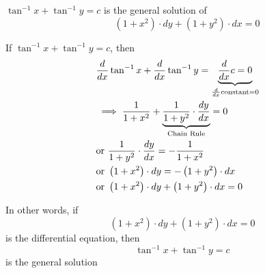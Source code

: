 \documentclass[14pt,fleqn]{extarticle}
\newcommand\itanx{\tan^{-1} x}
\newcommand\itany{\tan^{-1} y}
\newcommand\trma{\left(1+x^2 \right)}
\newcommand\trmb{ \left(1+y^2 \right)}
\begin{document}
 
\begin{snippet}
    \correct
    
    $\itanx + \itany = c$ is the general solution of 
    \[ \qquad \left(1+x^2 \right)\cdot dy + \left(1+y^2 \right)\cdot dx = 0 \]    
    
    \reason
    
    If $\itanx + \itany = c$, then 
    \begin{align}
	&\ddx \itanx + \ddx \itany = \underbrace{\ddx c = 0}_{\ddx\text{constant} = 0}\\
	&\implies \frac{1}{1+x^2} + \underbrace{\frac{1}{1+y^2}\cdot \dydx}_{\text{Chain Rule}} = 0 \\
	&\text{or }\frac{1}{1+y^2}\cdot \dydx = -\frac{1}{1+x^2} \\
	&\text{or }\trma\cdot dy = -\trmb\cdot dx \\
	&\text{or }\trma\cdot dy + \trmb\cdot dx = 0 
\end{align}

In other words, if 
\[\quad \trma\cdot dy + \trmb\cdot dx = 0\] is the differential equation, then  
\[ \quad \itanx + \itany = c\]
is the general solution
    
\end{snippet} 
\end{document}
